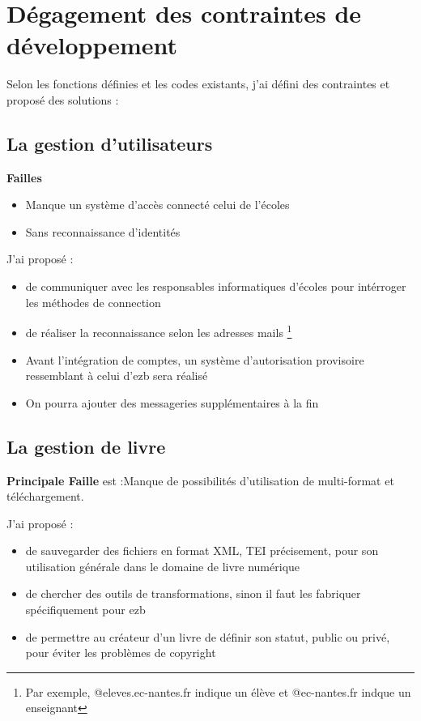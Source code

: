\section{Dégagement des contraintes de développement}

Selon les fonctions définies et les codes existants, j'ai défini des contraintes et proposé des solutions :


\subsection{La gestion d'utilisateurs}

\textbf{Failles} 

\begin{itemize}
    \item Manque un système d'accès connecté celui de l’écoles
    \item Sans reconnaissance d’identités
\end{itemize}

J'ai proposé :

\begin{itemize}
    \item de communiquer avec les responsables informatiques d'écoles pour intérroger les méthodes de connection
    \item de réaliser la reconnaissance selon les adresses mails \footnote{ Par exemple, @eleves.ec-nantes.fr indique un élève et @ec-nantes.fr indque un enseignant } 
    \item Avant l'intégration de comptes, un système d'autorisation provisoire ressemblant à celui d'ezb sera réalisé
    \item On pourra ajouter des messageries supplémentaires à la fin
\end{itemize}


\subsection{La gestion de livre}

\textbf{Principale Faille} est :Manque de possibilités d'utilisation de multi-format et téléchargement.

J'ai proposé :

\begin{itemize}
    \item de sauvegarder des fichiers en format XML, TEI précisement, pour son utilisation générale dans le domaine de livre numérique
    \item de chercher des outils de transformations, sinon il faut les fabriquer spécifiquement pour ezb
    \item de permettre au créateur d'un livre de définir son statut, public ou privé, pour éviter les problèmes de copyright
\end{itemize}


